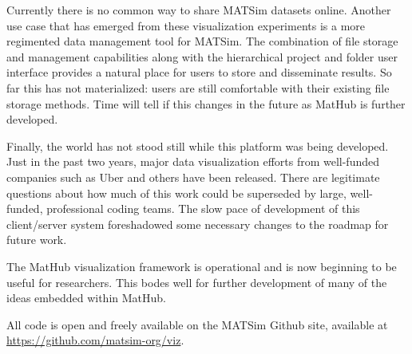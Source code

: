 Currently there is no common way to share MATSim datasets online. Another use case that has emerged from these visualization experiments is a more regimented data management tool for MATSim. The combination of file storage and management capabilities along with the hierarchical project and folder user interface provides a natural place for users to store and disseminate results. So far this has not materialized: users are still comfortable with their existing file storage methods. Time will tell if this changes in the future as MatHub is further developed.

Finally, the world has not stood still while this platform was being developed. Just in the past two years, major data visualization efforts from well-funded companies such as Uber and others have been released. There are legitimate questions about how much of this work could be superseded by large, well-funded, professional coding teams. The slow pace of development of this client/server system foreshadowed some necessary changes to the roadmap for future work.

The MatHub visualization framework is operational and is now beginning to be useful for researchers. This bodes well for further development of many of the ideas embedded within MatHub.

All code is open and freely available on the MATSim Github site, available at \url{https://github.com/matsim-org/viz}.
